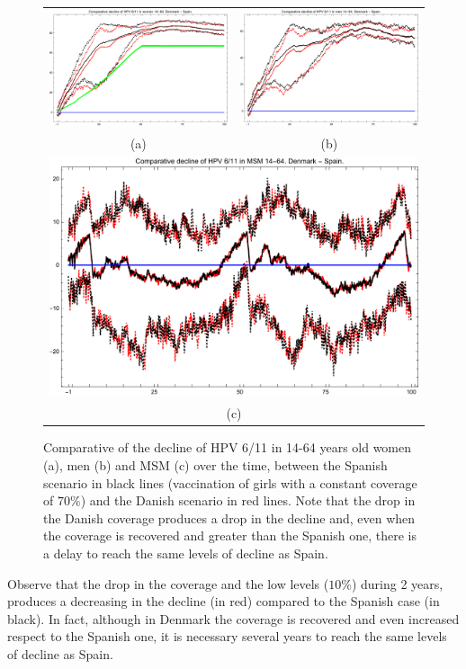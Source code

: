 \begin{figure}[!]
	\centering
	\begin{tabular}{cc}
		\includegraphics[width=0.5\linewidth]{IMGs/8.-Dinamarca/Decl_muj_14_64_verr_Dinamarca.pdf}	& 
		\includegraphics[width=0.5\linewidth]{IMGs/8.-Dinamarca/Decl_hom_14_64_verr_Dinamarca.pdf}  \\ 
		(a)	& (b) \\ 
		\multicolumn{2}{c}{ \includegraphics[width=0.5\linewidth]{IMGs/8.-Dinamarca/Decl_MSM_14_64_verr_Dinamarca.pdf} } \\ 
		\multicolumn{2}{c}{(c)} \\ 
	\end{tabular} 
	\caption{Comparative of the decline of  HPV 6/11 in 14-64 years old women (a), men (b) and MSM (c) over the time, between the Spanish scenario in black lines (vaccination of girls with a constant coverage of $70\%$) and the Danish scenario in red lines. Note that the drop in the Danish coverage produces a drop in the decline and, even when the coverage is recovered and greater than the Spanish one, there is a delay to reach the same levels of decline as Spain.}
	\label{fig:dinamarca}
\end{figure}

Observe that the drop in the coverage and the low levels ($10\%$) during 2 years, produces a decreasing in the decline (in red) compared to the Spanish case (in black). In fact, although in Denmark the coverage is recovered and even increased respect to the Spanish one, it is necessary several years to reach the same levels of decline as Spain.
